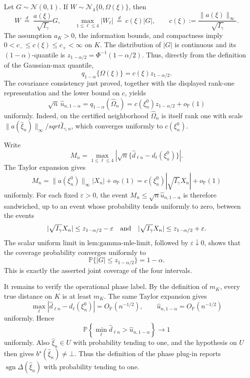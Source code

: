 Let \(G\sim\mathcal N(0,1)\).  If \(W\sim\mathcal N_4\{0,\Omega(\xi)\}\), then
\[
 W\ \stackrel{d}{=}\ \frac{a(\xi)}{\sqrt{I_\gamma}}G,
 \qquad
 \max_{1\le\ell\le4}|W_\ell|
 \ \stackrel{d}{=}\ c(\xi)|G|,
 \qquad
 c(\xi):=\frac{\|a(\xi)\|_\infty}{\sqrt{I_\gamma}}.
\]
The assumption \(a_K>0\), the information bounds, and compactness imply
\(0<c_-\le c(\xi)\le c_+<\infty\) on \(K\).  The distribution of \(|G|\) is continuous and its \((1-\alpha)\)-quantile is \(z_{1-\alpha/2}=\Phi^{-1}(1-\alpha/2)\).  Thus, directly from the definition of the Gaussian-max quantile,
\[
 q_{1-\alpha}\{\Omega(\xi)\}=c(\xi)z_{1-\alpha/2}.
\]
The covariance consistency just proved, together with the displayed rank-one representation and the lower bound on \(c\), yields
\[
 \sqrt n\,\widehat u_{n,1-\alpha}
 =q_{1-\alpha}(\widehat\Omega_n)
 =c(\xi_n^0)z_{1-\alpha/2}+o_{\mathbb P}(1)
\]
uniformly.  Indeed, on the certified neighborhood \(\widehat\Omega_n\) is itself rank one with scale
\(\|a(\widehat\xi_n)\|_\infty/sqrt{\widehat I_{\gamma,n}}\), which converges uniformly to \(c(\xi_n^0)\).

Write
\[
 M_n=\max_{1\le\ell\le4}
 \left|\sqrt n\{\widehat d_{\ell n}-d_\ell(\xi_n^0)\}\right|.
\]
The Taylor expansion gives
\[
 M_n=\|a(\xi_n^0)\|_\infty|X_n|+o_{\mathbb P}(1)
     =c(\xi_n^0)|\sqrt{I_\gamma}X_n|+o_{\mathbb P}(1)
\]
uniformly.  For each fixed \(\varepsilon>0\), the event
\(M_n\le\sqrt n\widehat u_{n,1-\alpha}\) is therefore sandwiched, up to an event whose probability tends uniformly to zero, between the events
\[
 |\sqrt{I_\gamma}X_n|\le z_{1-\alpha/2}-\varepsilon
 \quad\hbox{and}\quad
 |\sqrt{I_\gamma}X_n|\le z_{1-\alpha/2}+\varepsilon.
\]
The scalar uniform limit in \(\text{lem:gamma-mle-limit}\), followed by \(\varepsilon\downarrow0\), shows that the coverage probability converges uniformly to
\[
 \mathbb P\{|G|\le z_{1-\alpha/2}\}=1-\alpha.
\]
This is exactly the asserted joint coverage of the four intervals.

It remains to verify the operational phase label.  By the definition of \(m_K\), every true distance on \(K\) is at least \(m_K\).  The same Taylor expansion gives
\[
 \max_\ell|\widehat d_{\ell n}-d_\ell(\xi_n^0)|=O_{\mathbb P}(n^{-1/2}),
 \qquad
 \widehat u_{n,1-\alpha}=O_{\mathbb P}(n^{-1/2})
\]
uniformly.  Hence
\[
 \mathbb P\!\left\{
   \min_\ell\widehat d_{\ell n}>\widehat u_{n,1-\alpha}
 \right\}\longrightarrow1
\]
uniformly.  Also \(\widehat\xi_n\in U\) with probability tending to one, and the hypothesis on \(U\) then gives \(b^\star(\widehat\xi_n)\ne\bot\).  Thus the definition of the phase plug-in reports \(\operatorname{sgn}\Delta(\widehat\xi_n)\) with probability tending to one.

